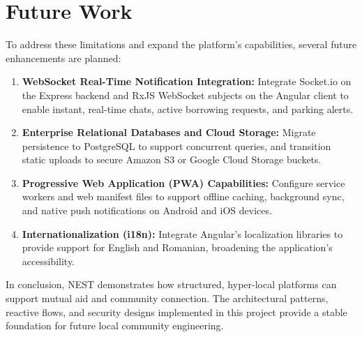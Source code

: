 \section{Future Work}
To address these limitations and expand the platform's capabilities, several future enhancements are planned:
\begin{enumerate}
    \item \textbf{WebSocket Real-Time Notification Integration:} Integrate Socket.io on the Express backend and RxJS WebSocket subjects on the Angular client to enable instant, real-time chats, active borrowing requests, and parking alerts.
    \item \textbf{Enterprise Relational Databases and Cloud Storage:} Migrate persistence to PostgreSQL to support concurrent queries, and transition static uploads to secure Amazon S3 or Google Cloud Storage buckets.
    \item \textbf{Progressive Web Application (PWA) Capabilities:} Configure service workers and web manifest files to support offline caching, background sync, and native push notifications on Android and iOS devices.
    \item \textbf{Internationalization (i18n):} Integrate Angular's localization libraries to provide support for English and Romanian, broadening the application's accessibility.
\end{enumerate}

In conclusion, NEST demonstrates how structured, hyper-local platforms can support mutual aid and community connection. The architectural patterns, reactive flows, and security designs implemented in this project provide a stable foundation for future local community engineering.
